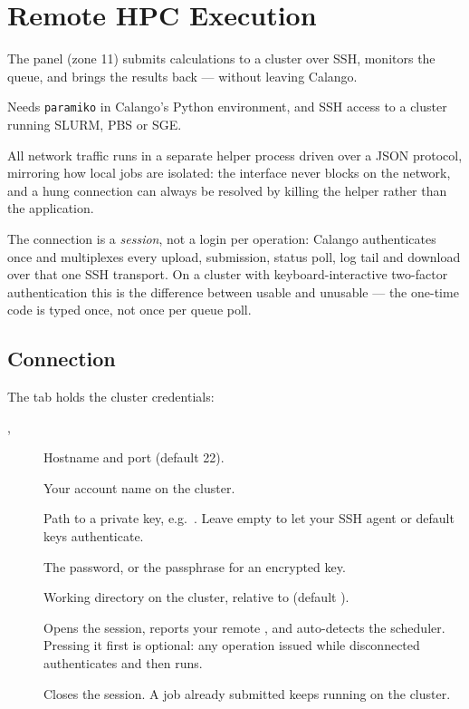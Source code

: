 \chapter{Remote HPC Execution}
\label{ch:remote}

The  panel (zone 11) submits calculations to a cluster
over SSH, monitors the queue, and brings the results back --- without
leaving Calango.

\begin{calwarn}
Needs \texttt{paramiko} in Calango's Python environment, and SSH access to
a cluster running SLURM, PBS or SGE.
\end{calwarn}

\begin{calnote}
All network traffic runs in a separate helper process driven over a JSON
protocol, mirroring how local jobs are isolated: the interface never blocks
on the network, and a hung connection can always be resolved by killing
the helper rather than the application.
\end{calnote}

\begin{calnote}
The connection is a \emph{session}, not a login per operation: Calango
authenticates once and multiplexes every upload, submission, status poll,
log tail and download over that one SSH transport. On a cluster with
keyboard-interactive two-factor authentication this is the difference
between usable and unusable --- the one-time code is typed once, not once
per queue poll.
\end{calnote}

\section{Connection}

The  tab holds the cluster credentials:

\begin{description}
  \item[, ] Hostname and port (default 22).
  \item[] Your account name on the cluster.
  \item[] Path to a private key, e.g.\
    . Leave empty to let your SSH agent
    or default keys authenticate.
  \item[] The password, or the passphrase for an encrypted
    key.
  \item[] Working directory on the cluster, relative to
     (default \file{calango\_jobs}).
  \item[] Opens the session, reports your remote
    \opt{\$HOME}, and auto-detects the scheduler. Pressing it first is
    optional: any operation issued while disconnected authenticates and
    then runs.
  \item[] Closes the session. A job already submitted keeps
    running on the cluster.
\end{description}

